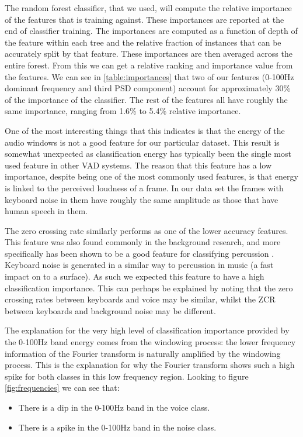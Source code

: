 \documentclass[ %
                    author={Sam Phippen},
                supervisor={Dr. Rafal Bogacz},
                     title={Real time voice activity detectors in noisy personal computing environments},
                  subtitle={},
                    degree={MEng},
                      year={2012} ]{thesis}
\begin{document}
The random forest classifier, that we used, will compute the relative
importance of the features that is training against. These importances are
reported at the end of classifier training. The importances are computed as a
function of depth of the feature within each tree and the relative fraction of
instances that can be accurately split by that feature. These importances are
then averaged across the entire forest. From this we can get a relative ranking
and importance value from the features. We can see in \ref{table:importances} that two of our
features (0-100Hz dominant frequency and third PSD component) account for
approximately 30\% of the importance of the classifier. The rest of the
features all have roughly the same importance, ranging from 1.6\% to
5.4\% relative importance.

One of the most interesting things that this indicates is that the energy of
the audio windows is not a good feature for our particular dataset. This result
is somewhat unexpected as classification energy has typically been the single
most used feature in other VAD systems. The reason that this feature has a low
importance, despite being one of the most commonly used features, is that
energy is linked to the perceived loudness of a frame. In our data set the
frames with keyboard noise in them have roughly the same amplitude as those
that have human speech in them.

The zero crossing rate similarly performs as one of the lower accuracy
features. This feature was also found commonly in the background research, and
more specifically has been shown to be a good feature for classifying
percussion \cite{gouyon}. Keyboard noise is generated in a similar way to
percussion in music (a fast impact on to a surface). As such we expected this
feature to have a high classification importance. This can perhaps be explained
by noting that the zero crossing rates between keyboards and voice may be
similar, whilst the ZCR between keyboards and background noise may be
different.

The explanation for the very high level of classification importance provided
by the 0-100Hz band energy comes from the windowing process: the lower
frequency information of the Fourier transform is naturally amplified by the
windowing process. This is the explanation for why the Fourier transform shows
such a high spike for both classes in this low frequency region. Looking to
figure \ref{fig:frequencies} we can see that:

\begin{itemize}

    \item There is a dip in the 0-100Hz band in the voice class.

    \item There is a spike in the 0-100Hz band in the noise class.

\end{itemize}
\end{document}
